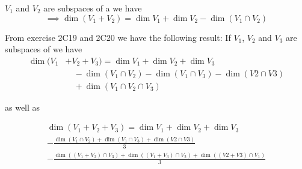 \begin{thm}  
  \label{dimension of a sum}
  $V_1$ and $V_2$ are subspaces of a \fdvs we have
  \begin{equation}
    \implies \dim (V_1 + V_2) = \dim V_1 + \dim V_2 - \dim (V_1 \cap V_2)
  \end{equation}

  From exercise 2C19 and 2C20 we have the following result:
  If $V_1$, $V_2$ and $V_3$ are subspaces of \fdvs we have
  \begin{equation}
    \begin{aligned}
      \dim (V_1 &+ V_2 + V_3) = \dim V_1 + \dim V_2 + \dim V_3 \\
      & \quad - \dim (V_1 \cap V_2) - \dim (V_1 \cap V_3) - \dim (V2 \cap V3) \\
      & \quad + \dim (V_1 \cap V_2 \cap V_3)
    \end{aligned}
  \end{equation}

as well as

  \begin{equation}
    \begin{aligned}
      \dim (V_1 + V_2 + V_3)  = \dim V_1 + \dim V_2 + \dim V_3 \\
        - \frac{\dim (V_1 \cap V_2) + \dim (V_1 \cap V_3) + \dim (V2 \cap V3)}{3} \\
       - \frac{ \dim \left(  (V_1 + V_2) \cap V_3 \right) + \dim \left( (V_1 + V_3) \cap V_2 \right)+ \dim \left( (V2 + V3) \cap V_1 \right) }{3} \\
    \end{aligned}
  \end{equation}
\end{thm}

